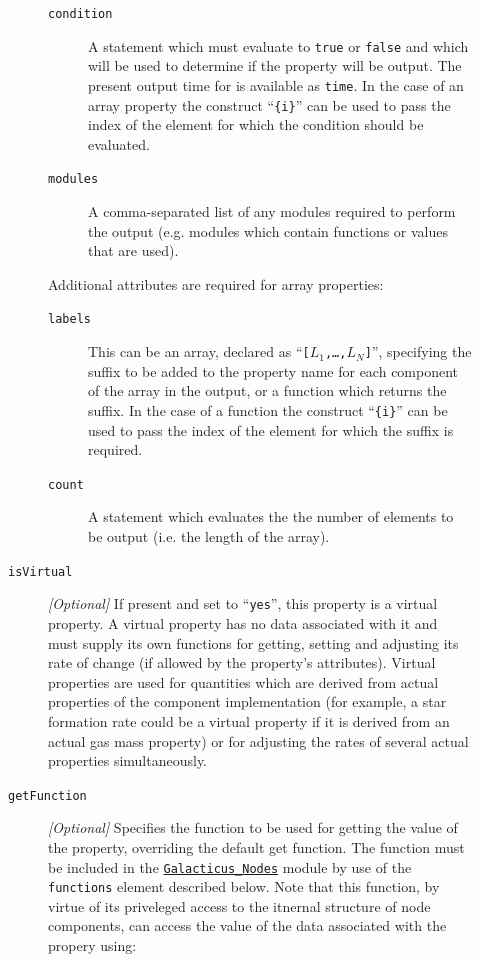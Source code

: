 \begin{description}
\begin{description}
\begin{description}
\item [{\tt condition}] A statement which must evaluate to {\tt true} or {\tt false} and which will be used to determine if the property will be output. The present output time for is available as {\tt time}. In the case of an array property the construct ``{\tt \{i\}}'' can be used to pass the index of the element for which the condition should be evaluated.
\item [{\tt modules}] A comma-separated list of any modules required to perform the output (e.g. modules which contain functions or values that are used).
\end{description}
Additional attributes are required for array properties:
\begin{description}
\item [{\tt labels}] This can be an array, declared as ``{\tt [$L_1$,\ldots,$L_N$]}'', specifying the suffix to be added to the property name for each component of the array in the output, or a function which returns the suffix. In the case of a function the construct ``{\tt \{i\}}'' can be used to pass the index of the element for which the suffix is required.
\item [{\tt count}] A statement which evaluates the the number of elements to be output (i.e. the length of the array).
\end{description}
\item [{\tt isVirtual}] \emph{[Optional]} If present and set to ``{\tt yes}'', this property is a virtual property. A virtual property has no data associated with it and must supply its own functions for getting, setting and adjusting its rate of change (if allowed by the property's attributes). Virtual properties are used for quantities which are derived from actual properties of the component implementation (for example, a star formation rate could be a virtual property if it is derived from an actual gas mass property) or for adjusting the rates of several actual properties simultaneously.
\item [{\tt getFunction}] \emph{[Optional]} Specifies the function to be used for getting the value of the property, overriding the default get function. The function must be included in the \hyperlink{objects.nodes.F90:galacticus_nodes}{\tt Galacticus\_Nodes} module by use of the {\tt functions} element described below. Note that this function, by virtue of its priveleged access to the itnernal structure of node components, can access the value of the data associated with the propery using:
\begin{verbatim}

\end{verbatim}
\end{description}
\end{description}
